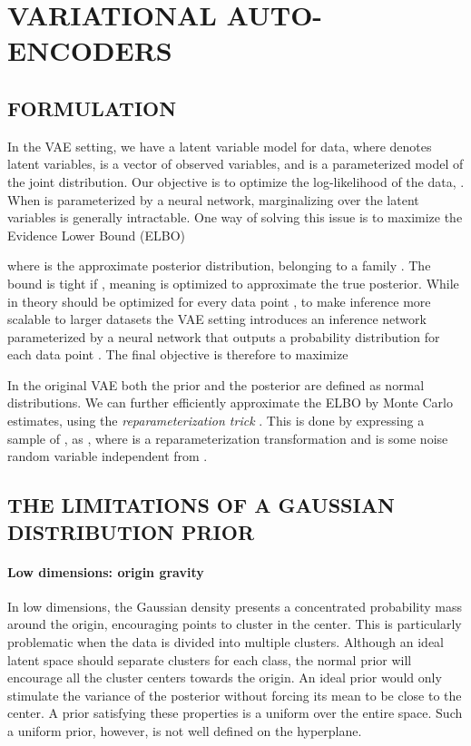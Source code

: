 \documentclass[letterpaper]{article}
\begin{document}
\section{VARIATIONAL AUTO-ENCODERS}
\label{sec:vae}

\subsection{FORMULATION} \label{subsec:formulation}
In the VAE setting, we have a latent variable model for data, where  denotes latent variables,  is a vector of  observed variables, and  is a parameterized model of the joint distribution. Our objective is to optimize the log-likelihood of the data, . When  is parameterized by a neural network, marginalizing over the latent variables is generally intractable. One way of solving this issue is to maximize the Evidence Lower Bound (ELBO)

where  is the approximate posterior distribution, belonging to a family . The bound is tight if , meaning  is optimized to approximate the true posterior. While in theory  should be optimized for every data point , to make inference more scalable to larger datasets the VAE setting introduces an inference network  parameterized by a neural network that outputs a probability distribution for each data point . The final objective is therefore to maximize

In the original VAE both the prior and the posterior are defined as normal distributions. We can further efficiently approximate the ELBO by Monte Carlo estimates, using the \textit{reparameterization trick} \citep{journals/corr/KingmaW13, rezende2014stochastic}. This is done by expressing a sample of , as , where  is a reparameterization transformation and  is some noise random variable independent from .

\subsection{THE LIMITATIONS OF A GAUSSIAN DISTRIBUTION PRIOR} \label{subsec:lim-gaussian-prior}

\paragraph{Low dimensions: origin gravity} \label{par:lowdim}
In low dimensions, the Gaussian density presents a concentrated probability mass around the origin, encouraging points to cluster in the center. This is particularly problematic when the data is divided into multiple clusters. Although an ideal latent space should separate clusters for each class, the normal prior will encourage all the cluster centers towards the origin. An ideal prior would only stimulate the variance of the posterior without forcing its mean to be close to the center. A prior satisfying these properties is a uniform over the entire space. Such a uniform prior, however, is not well defined on the hyperplane.
 
\end{document}
